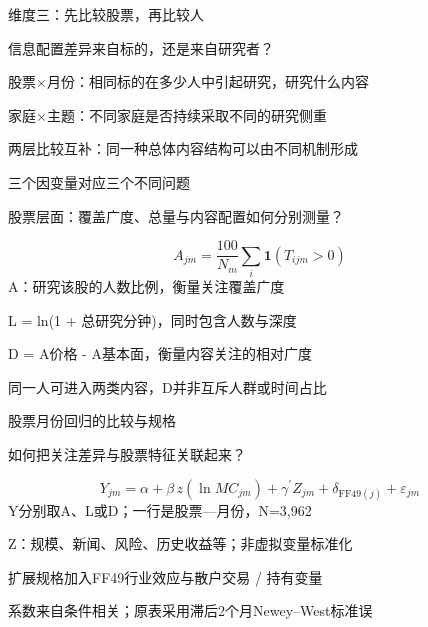 \documentclass[11pt,compress]{beamer}
\begin{document}
\begin{frame}{维度三：先比较股票，再比较人}\relax
{\small\color{tsinghua}信息配置差异来自标的，还是来自研究者？\par}\medskip
股票×月份：相同标的在多少人中引起研究，研究什么内容\par\medskip
家庭×主题：不同家庭是否持续采取不同的研究侧重\par\medskip
两层比较互补：同一种总体内容结构可以由不同机制形成\par\medskip
{}
\end{frame}
\begin{frame}{三个因变量对应三个不同问题}\relax
{\small\color{tsinghua}股票层面：覆盖广度、总量与内容配置如何分别测量？\par}\medskip
\begin{equation*}A_{jm}=\frac{100}{N_m}\sum_i\mathbf1(T_{ijm}>0)\end{equation*}\medskip
A：研究该股的人数比例，衡量关注覆盖广度\par\medskip
L = ln(1 + 总研究分钟)，同时包含人数与深度\par\medskip
D = A价格 - A基本面，衡量内容关注的相对广度\par\medskip
同一人可进入两类内容，D并非互斥人群或时间占比\par\medskip
{}
\end{frame}
\begin{frame}{股票月份回归的比较与规格}\relax
{\small\color{tsinghua}如何把关注差异与股票特征关联起来？\par}\medskip
\begin{equation*}Y_{jm}=\alpha+\beta\,z(\ln MC_{jm})+\gamma^{\prime}Z_{jm}+\delta_{\mathrm{FF49}(j)}+\varepsilon_{jm}\end{equation*}\medskip
Y分别取A、L或D；一行是股票—月份，N=3,962\par\medskip
Z：规模、新闻、风险、历史收益等；非虚拟变量标准化\par\medskip
扩展规格加入FF49行业效应与散户交易 / 持有变量\par\medskip
系数来自条件相关；原表采用滞后2个月Newey–West标准误\par\medskip
{}
\end{frame}
\end{document}
